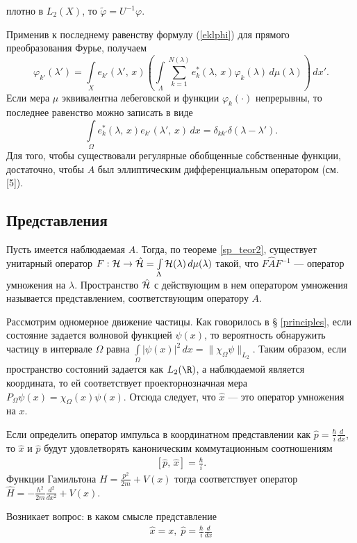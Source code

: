 \documentclass[a4paper
]{article}
\begin{document}
плотно в $L_2(X)$, то $\tilde \varphi=U^{-1}\varphi$. \par
Применив к последнему равенству формулу (\ref{eklphi}) для прямого преобразования Фурье,
получаем $$\varphi_{k'}(\lambda')=\int \limits_X e_{k'}(\lambda', \,
x)\left(\int \limits_{\Lambda}\sum \limits_{k=1}^{N(\lambda)}
e_k^*(\lambda, \, x)\varphi_k(\lambda)\, d\mu(\lambda) \right)\, dx'.$$
Если мера $\mu$ эквивалентна лебеговской и функции $\varphi_k(\cdot)$
непрерывны, то последнее равенство можно записать в виде $$\int
\limits_{\Omega}e_k^*(\lambda, \, x)e_{k'}(\lambda', \, x)\, dx=
\delta _{kk'}\delta(\lambda-\lambda').$$
Для того, чтобы существовали регулярные обобщенные собственные функции,
достаточно, чтобы $A$ был эллиптическим дифференциальным оператором
(см. [5]).
\subsection{Представления}
Пусть имеется наблюдаемая $A$. Тогда, по теореме \ref{sp_teor2},
существует унитарный оператор $F:{\cal H}\rightarrow \hat{{\cal H}}=
\int \limits_{\Lambda}{\cal H}(\lambda)\, d\mu(\lambda)$ такой, что
$F\hat{A}F^{-1}$ --- оператор умножения на $\lambda$. Пространство
$\hat{{\cal H}}$ с действующим в нем оператором умножения называется
представлением, соответствующим оператору $A$. \par
Рассмотрим одномерное движение частицы. Как говорилось в \S
\ref{principles}, если состояние задается волновой функцией $\psi(x)$,
то вероятность обнаружить частицу в интервале $\Omega$ равна $\int
\limits_{\Omega}|\psi(x)|^2\, dx=\|\chi_{\Omega}\psi\|_{L_2}$. Таким
образом, если пространство состояний задается как $L_2(\R)$, а
наблюдаемой является координата, то ей соответствует проекторнозначная мера
$P_\Omega\psi(x)=\chi_\Omega(x)\psi(x)$. Отсюда следует, что $\hat x$
--- это оператор умножения на $x$. \par
Если определить оператор импульса в координатном представлении
как $\hat{p}=\frac{\hbar}{i}\frac{d}{dx}$, то $\hat{x}$ и $\hat{p}$
будут удовлетворять каноническим коммутационным соотношениям
\begin{align}
\label{kks}
[\hat{p}, \, \hat{x}]=\frac{\hbar}{i}.
\end{align}
Функции Гамильтона $H=\frac{p^2}{2m}+V(x)$ тогда соответствует оператор
$\hat{H}=-\frac{\hbar ^2}{2m}\frac{d^2}{dx^2}+V(x)$. \par
Возникает вопрос: в каком смысле представление
\begin{align}
\hat{x}=x, \; \hat{p}=\frac{\hbar}{i}\frac{d}{dx}
\label{shre_predst}
\end{align}
\end{document}
